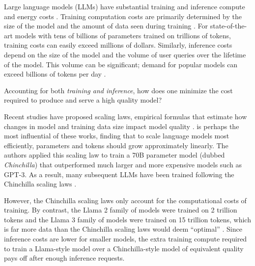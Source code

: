 \documentclass{article}
\theoremstyle{plain}
\theoremstyle{definition}
\theoremstyle{remark}
\begin{document}
Large language models (LLMs) have substantial training and inference compute and energy costs \cite{openaiinterview, palminference}. Training computation costs are primarily determined by the size of the model and the amount of data seen during training \cite{chinchilla}. For state-of-the-art models with tens of billions of parameters trained on trillions of tokens, training costs can easily exceed millions of dollars. 
Similarly, inference costs depend on the size of the model and the volume of user queries over the lifetime of the model. This volume can be significant; demand for popular models can exceed billions of tokens per day \cite{openaidemand, characterai}.

Accounting for both \textit{training and inference}, how does one minimize the cost required to produce and serve a high quality model?

Recent studies have proposed scaling laws, empirical formulas that estimate how changes in model and training data size impact model quality \citep{scalinglaws, chinchilla}. \citet{chinchilla} is perhaps the most influential of these works, finding that to scale language models most efficiently, parameters and tokens should grow approximately linearly. The authors applied this scaling law to train a 70B parameter model (dubbed \textit{Chinchilla}) that outperformed much larger and more expensive models such as GPT-3. As a result, many subsequent LLMs have been trained following the Chinchilla scaling laws \citep{cerebrasgpt, dataconstrained}.

However, the Chinchilla scaling laws only account for the computational costs of training. By contrast, the Llama 2 family of models were trained on 2 trillion tokens and the Llama 3 family of models were trained on 15 trillion tokens, which is far more data than the Chinchilla scaling laws would deem ``optimal'' \citep{llama, llama2, llama3}. Since inference costs are lower for smaller models, the extra training compute required to train a Llama-style model over a Chinchilla-style model of equivalent quality pays off after enough inference requests. 
\end{document}
